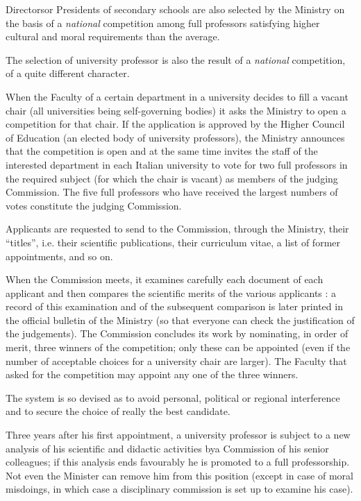 \setcounter{pageoriginal}{122}
Directors\pageoriginale or Presidents of secondary schools are also selected by the Ministry on the basis of a {\em national} competition among full professors satisfying higher cultural and moral requirements than the average.

The selection of university professor is also the result of a {\em national} competition, of a quite different character.

When the Faculty of a certain department in a university decides to fill a vacant chair (all universities being self-governing bodies) it asks the Ministry to open a competition for that chair. If the application is approved by the Higher Council of Education (an elected body of university professors), the Ministry announces that the competition is open and at the same time invites the staff of the interested department in each Italian university to vote for two full professors in the required subject (for which the chair is vacant) as members of the judging Commission. The five full professors who have received the largest numbers of votes constitute the judging Commission.

Applicants are requested to send to the Commission, through the Ministry, their ``titles'', i.e. their scientific publications, their curriculum vitae, a list of former appointments, and so on.

When the Commission meets, it examines carefully each document of each applicant and then compares the scientific merits of the various applicants : a record of this examination and of the subsequent comparison is later printed in the official bulletin of the Ministry (so that everyone can check the justification of the judgements). The Commission concludes its work by nominating, in order of merit, three winners of the competition; only these can be appointed (even if the number of acceptable choices for a university chair are larger). The Faculty that asked for the competition may appoint any one of the three winners.

The system is so devised as to avoid personal, political or regional interference and to secure the choice of really the best candidate.

Three years after his first appointment, a university professor is subject to a new analysis of his scientific and didactic activities by\pageoriginale a Commission of his senior colleagues; if this analysis ends favourably he is promoted to a full professorship. Not even the Minister can remove him from this position (except in case of moral misdoings, in which case a disciplinary commission is set up to examine his case).

